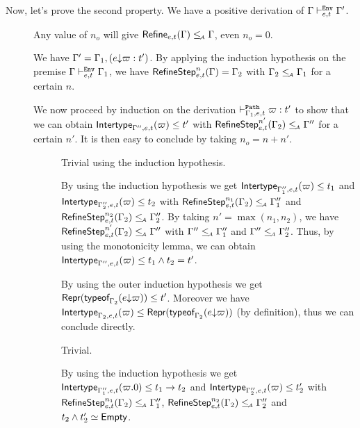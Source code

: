 \documentclass[a4paper]{article}
\theoremstyle{definition}
\begin{document}
  \ 

  Now, let's prove the second property. We have a positive derivation of $\Gamma \vdash^{\texttt{Env}}_{e,t} \Gamma'$.

  \begin{description}
    \item[] Any value of $n_o$ will give $\textsf{Refine}_{e,t}(\Gamma) \leq_{\!\scriptscriptstyle\mathcal{A}} \Gamma$, even $n_o = 0$.
    \item[] We have $\Gamma' = \Gamma_1,(e{\downarrow}\varpi:t')$.
    By applying the induction hypothesis on the premise $\Gamma \vdash^{\texttt{Env}}_{e,t} \Gamma_1$, we have
    $\textsf{RefineStep}_{e,t}^n (\Gamma) = \Gamma_2$ with $\Gamma_2 \leq_{\!\scriptscriptstyle\mathcal{A}} \Gamma_1$ for a certain $n$.

    We now proceed by induction on the derivation $\vdash^{\texttt{Path}}_{\Gamma_1,e,t} \varpi:t'$
    to show that we can obtain $\textsf{Intertype}_{\Gamma'',e,t} (\varpi) \leq t'$ with $\textsf{RefineStep}_{e,t}^{n'} (\Gamma_2) \leq_{\!\scriptscriptstyle\mathcal{A}} \Gamma''$
    for a certain $n'$. It is then easy to conclude by taking $n_o = n+n'$.

    \begin{description}
      \item[] Trivial using the induction hypothesis.
      \item[] By using the induction hypothesis we get
      $\textsf{Intertype}_{\Gamma_1'',e,t} (\varpi) \leq t_1$ and $\textsf{Intertype}_{\Gamma_2'',e,t} (\varpi) \leq t_2$
      with $\textsf{RefineStep}_{e,t}^{n_1} (\Gamma_2) \leq_{\!\scriptscriptstyle\mathcal{A}} \Gamma_1''$ and
      $\textsf{RefineStep}_{e,t}^{n_2} (\Gamma_2) \leq_{\!\scriptscriptstyle\mathcal{A}} \Gamma_2''$. By taking $n'=\max (n_1,n_2)$,
      we have $\textsf{RefineStep}_{e,t}^{n'} (\Gamma_2) \leq_{\!\scriptscriptstyle\mathcal{A}} \Gamma''$ with $\Gamma'' \leq_{\!\scriptscriptstyle\mathcal{A}} \Gamma_1''$ and $\Gamma'' \leq_{\!\scriptscriptstyle\mathcal{A}} \Gamma_2''$.
      Thus, by using the monotonicity lemma, we can obtain $\textsf{Intertype}_{\Gamma'',e,t} (\varpi) \leq t_1 \land t_2 = t'$.
      \item[] By using the outer induction hypothesis we get
      $\textsf{Repr}(\textsf{typeof}_{\Gamma_2}(e{\downarrow}\varpi)) \leq t'$.
      Moreover we have $\textsf{Intertype}_{\Gamma_2,e,t} (\varpi) \leq \textsf{Repr}(\textsf{typeof}_{\Gamma_2}(e{\downarrow}\varpi))$
      (by definition), thus we can conclude directly.
      \item[] Trivial.
       
      \item[] By using the induction hypothesis we get
      $\textsf{Intertype}_{\Gamma_1'',e,t} (\varpi.0) \leq t_1\to t_2$ and $\textsf{Intertype}_{\Gamma_2'',e,t} (\varpi) \leq t_2'$
      with $\textsf{RefineStep}_{e,t}^{n_1} (\Gamma_2) \leq_{\!\scriptscriptstyle\mathcal{A}} \Gamma_1''$, $\textsf{RefineStep}_{e,t}^{n_2} (\Gamma_2) \leq_{\!\scriptscriptstyle\mathcal{A}} \Gamma_2''$
      and $t_2\land t_2' \simeq \textsf{Empty}$.
      

\end{description}
\end{description}
\end{document}
